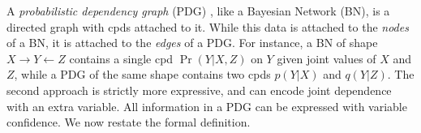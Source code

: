 \documentclass[twoside]{article}
\theoremstyle{plain}
\theoremstyle{definition}
\newcommand{\ed}[3]{#2%
		  \overset{\smash{\mskip-5mu\raisebox{-1pt}{$\scriptscriptstyle
		        #1$}}}{\rightarrow} #3}
\begin{document}
A \emph{probabilistic dependency graph} (PDG)
\parencite{richardson2020probabilistic}, like a Bayesian Network (BN), is a
directed graph with cpds attached to it. While this data is attached
to the \emph{nodes} of a BN, it is attached to the \emph{edges} of a PDG.
%
For instance, a BN of shape
$ X \!\to\! Y \!\leftarrow\! Z $
contains a single cpd $\Pr(Y | X,Z)$ on $Y$ given joint values of $X$ and $Z$,
while a PDG of the same shape contains two cpds $p(Y | X)$ and $q(Y | Z)$.
The second approach is strictly more expressive, and can encode joint dependence with an extra variable.
All information in a PDG can be expressed with variable confidence.
We now restate the formal definition.
\end{document}
